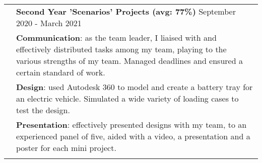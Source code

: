 \documentclass[letterpaper, 11pt]{article}
\begin{document}
\begin{longtable}{p{1.3in}p{4.8in}}


    {\color{OliveGreen}{Engineering projects}}
     & \textbf{Second Year 'Scenarios' Projects (avg: 77\%)} \hfill September 2020 - March 2021                                                                                                                           \\
     & \textbf{Communication}: as the team leader, I liaised with and effectively distributed tasks among my team, playing to the various strengths of my team. Managed deadlines and ensured a certain standard of work. \\
     & \textbf{Design}: used Autodesk 360 to model and create a battery tray for an electric vehicle. Simulated a wide variety of loading cases to test the design.                                                       \\
     & \textbf{Presentation}: effectively presented designs with my team, to an experienced panel of five, aided with a video, a presentation and a poster for each mini project.                                         \\
     &                                                                                                                                                                                                                    \\



\end{longtable}
\end{document}
